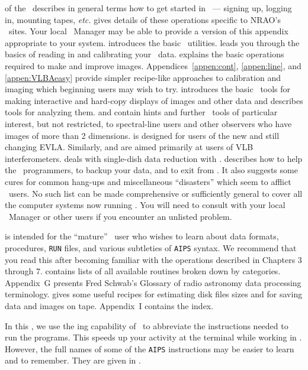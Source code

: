       of the \COOKBOOK\ describes in general terms how to
get started in \AIPS\ --- signing up, logging in, mounting tapes, {\it
etc.\/}   gives details of these operations specific to
NRAO's \AIPS\ sites.  Your local \AIPS\ Manager may be able to provide
a version of this appendix appropriate to your system.  
introduces the basic \AIPS\ utilities.   leads you through
the basics of reading in and calibrating your \uv\ data.
 explains the basic operations required to make and
improve images.  Appendices~\ref{appen:cont}, \ref{appen:line}, and
\ref{appen:VLBAeasy} provide simpler recipe-like approaches to
calibration and imaging which beginning users may wish to try.
 introduces the basic \AIPS\ tools for making interactive
and hard-copy displays of images and other data and 
describes tools for analyzing them.   and 
contain hints and further \AIPS\ tools of particular interest, but not
restricted, to spectral-line users and other observers who have images
of more than 2 dimensions.   is designed for users of
the new and still changing EVLA\@.  Similarly,  and
 are aimed primarily at users of VLB interferometers.
 deals with single-dish data reduction with \AIPS\@.
 describes how to help the \AIPS\ programmers, to backup
your data, and to exit from \AIPS\@.  It also suggests some cures for
common hang-ups and miscellaneous ``disasters'' which seem to afflict
\AIPS\ users.  No such list can be made comprehensive or sufficiently
general to cover all the computer systems now running \AIPS\@.  You
will need to consult with your local \AIPS\ Manager or other users if
you encounter an unlisted problem.

      is intended for the ``mature'' \AIPS\ user who
wishes to learn about data formats, procedures, {\tt RUN} files, and
various subtleties of {\tt AIPS} syntax.  We recommend that you read
this after becoming familiar with the operations described in Chapters
3 through 7.   contains lists of all available routines
broken down by categories.  Appendix~G presents Fred Schwab's Glossary
of radio astronomy data processing terminology.   gives
some useful recipes for estimating disk files sizes and for saving
data and images on tape.  Appendix~I contains the index.


     In this \COOKBOOK, we use the
ing capability of \AIPS\ to abbreviate the
instructions needed to run the programs.  This speeds up your activity
at the terminal while working in \AIPS\@.  However, the full names of
some of the {\tt AIPS} instructions may be easier to learn and to
remember.  They are given in .

